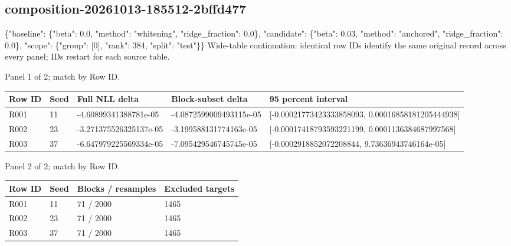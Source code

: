 \documentclass[10pt]{article}
\begin{document}
\subsection{composition-20261013-185512-2bffd477}
\{"baseline": \{"beta": 0.0, "method": "whitening", "ridge\_fraction": 0.0\}, "candidate": \{"beta": 0.03, "method": "anchored", "ridge\_fraction": 0.0\}, "scope": \{"group": [0], "rank": 384, "split": "test"\}\}
Wide-table continuation: identical row IDs identify the same original record across every panel; IDs restart for each source table.
\par\noindent Panel 1 of 2; match by Row ID.
{\scriptsize\setlength{\tabcolsep}{2pt}
\begin{longtable}{p{}p{}p{}p{}p{}}
Row ID & Seed & Full NLL delta & Block-subset delta & 95 percent interval \\
\hline\endhead
R001 & 11 & -4.60899341388781e-05 & -4.0872599009493115e-05 & [-0.00021773423333858093, 0.00016858181205444938] \\
R002 & 23 & -3.271375526325137e-05 & -3.199588131774163e-05 & [-0.00017418793593221199, 0.0001136384687997568] \\
R003 & 37 & -6.647979225569334e-05 & -7.095429546745745e-05 & [-0.0002918852072208844, 9.73636943746164e-05] \\
\end{longtable}}
\par\noindent Panel 2 of 2; match by Row ID.
{\scriptsize\setlength{\tabcolsep}{2pt}
\begin{longtable}{p{}p{}p{}p{}}
Row ID & Seed & Blocks / resamples & Excluded targets \\
\hline\endhead
R001 & 11 & 71 / 2000 & 1465 \\
R002 & 23 & 71 / 2000 & 1465 \\
R003 & 37 & 71 / 2000 & 1465 \\
\end{longtable}}
\end{document}
